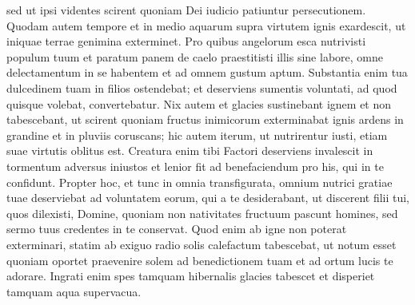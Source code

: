 \begin{biblechapter}
\begin{biblechapter}
\begin{biblechapter}
\begin{biblechapter}
\begin{biblechapter}
\begin{biblechapter}
\begin{biblechapter}
\begin{biblechapter}
\begin{biblechapter}
\begin{biblechapter}
\begin{biblechapter}
\begin{biblechapter}
\begin{biblechapter}
\begin{biblechapter}
\begin{biblechapter}
\begin{biblechapter}
 sed ut ipsi videntes
 scirent quoniam Dei iudicio patiuntur persecutionem.
 \verse Quodam autem tempore et in medio aquarum
 supra virtutem ignis exardescit,
 ut iniquae terrae genimina exterminet.
 \verse Pro quibus angelorum esca nutrivisti populum tuum
 et paratum panem de caelo praestitisti illis sine labore,
 omne delectamentum in se habentem
 et ad omnem gustum aptum.
 \verse Substantia enim tua dulcedinem tuam in filios ostendebat;
 et deserviens sumentis voluntati,
 ad quod quisque volebat, convertebatur.
 \verse Nix autem et glacies sustinebant ignem et non tabescebant,
 ut scirent quoniam fructus inimicorum
 exterminabat ignis ardens in grandine et in pluviis coruscans;
 \verse hic autem iterum, ut nutrirentur iusti,
 etiam suae virtutis oblitus est.
 \verse Creatura enim tibi Factori deserviens
 invalescit in tormentum adversus iniustos
 et lenior fit ad benefaciendum
 pro his, qui in te confidunt.
 \verse Propter hoc, et tunc in omnia transfigurata,
 omnium nutrici gratiae tuae deserviebat
 ad voluntatem eorum, qui a te desiderabant,
 \verse ut discerent filii tui, quos dilexisti, Domine,
 quoniam non nativitates fructuum pascunt homines,
 sed sermo tuus credentes in te conservat.
 \verse Quod enim ab igne non poterat exterminari,
 statim ab exiguo radio solis calefactum tabescebat,
 \verse ut notum esset quoniam oportet praevenire solem
 ad benedictionem tuam
 et ad ortum lucis te adorare.
 \verse Ingrati enim spes tamquam hibernalis glacies tabescet
 et disperiet tamquam aqua supervacua.
 

\end{biblechapter}
\end{biblechapter}
\end{biblechapter}
\end{biblechapter}
\end{biblechapter}
\end{biblechapter}
\end{biblechapter}
\end{biblechapter}
\end{biblechapter}
\end{biblechapter}
\end{biblechapter}
\end{biblechapter}
\end{biblechapter}
\end{biblechapter}
\end{biblechapter}
\end{biblechapter}
